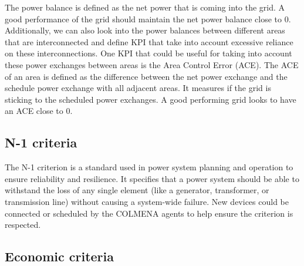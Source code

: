 \documentclass{article}
\begin{document}
The power balance is defined as the net power that is coming into the grid. A good performance of the grid should maintain the net power balance close to 0. Additionally, we can also look into the power balances between different areas that are interconnected and define KPI that take into account excessive reliance on these interconnections. One KPI that could be useful for taking into account these power exchanges between areas is the Area Control Error (ACE). The ACE of an area is defined as the difference between the net power exchange and the schedule power exchange with all adjacent areas. It measures if the grid is sticking to the scheduled power exchanges. A good performing grid looks to have an ACE close to $0$.  

\subsection*{N-1 criteria}

The N-1 criterion is a standard used in power system planning and operation to ensure reliability and resilience. It specifies that a power system should be able to withstand the loss of any single element (like a generator, transformer, or transmission line) without causing a system-wide failure. New devices could be connected or scheduled by the COLMENA agents to help ensure the criterion is respected. 


\subsection*{Economic criteria}


\end{document}
